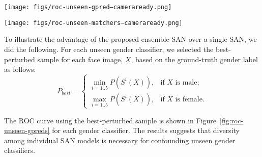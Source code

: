 \documentclass[10pt,twocolumn,letterpaper]{article}
\begin{document}
\begin{figure*}
\begin{center}
   \texttt{[image: figs/roc-unseen-gpred--cameraready.png]}
\end{center}
   \caption{ROC curves of the nine unseen gender classifiers (each row corresponds to one classifier) on the perturbed images generated by each SAN model of the E3 ensemble on four evaluation datasets: CelebA-test, MORPH-test, MUCT, and LFW. Note that the gender classification performance shows a wide degree of change on perturbed samples, but in all cases, there is always one output from each ensemble degrading the performance.  }
\label{fig:roc-unseen-gpreds}
\end{figure*}

\begin{figure*}
\begin{center}
\texttt{[image: figs/roc-unseen-matchers--cameraready.png]}
\end{center}
   \caption{ROC curves of the four unseen face matchers (each row corresponds to one matcher) on the perturbed images generated by each SAN model of the E3 ensemble on four evaluation datasets: CelebA-test, MORPH-test, MUCT, and RaFD. Note that the matching performance is mostly retained except for some small degradations in the case of FaceNet and OpenFace. }
\label{fig:roc-unseen-matchers}
\end{figure*}

To illustrate the advantage of the proposed ensemble SAN over a single SAN, we did the following. For each unseen gender classifier, we selected the best-perturbed sample for each face image, $X$, based on the ground-truth gender label as follows:
\begin{equation}
P_{best} = \left\{
\begin{array}{ll} 
\displaystyle \min_{i=1..5}P(S^i(X)), & \text{if }
X \text{ is male;}\\
\displaystyle \max_{i=1..5}P(S^i(X)), & \text{if }
X \text{ is female.}
\end{array}\right.
\end{equation}


The ROC curve using the best-perturbed sample is shown in Figure~\ref{fig:roc-unseen-gpreds} for each gender classifier. The results suggests that diversity among individual SAN models is necessary for confounding unseen gender classifiers. 
\end{document}
